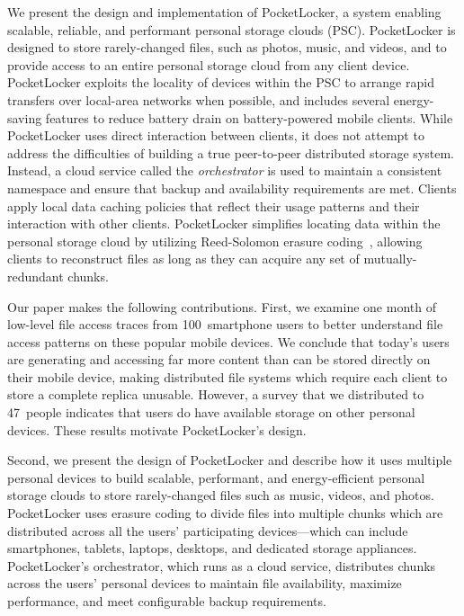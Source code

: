 We present the design and implementation of PocketLocker, a system enabling
scalable, reliable, and performant personal storage clouds (PSC). PocketLocker is
designed to store rarely-changed files, such as photos, music, and videos,
and to provide access to an entire personal storage cloud from any client
device. PocketLocker exploits the locality of devices within the PSC
to arrange rapid transfers over local-area networks when
possible, and includes several energy-saving features to reduce battery
drain on battery-powered mobile clients. While PocketLocker uses direct
interaction between clients, it does not attempt to address the difficulties
of building a true peer-to-peer distributed storage system. Instead, a cloud
service called the \textit{orchestrator} is used to maintain a consistent
namespace and ensure that backup and availability requirements are met.
Clients apply local data caching policies that reflect their usage patterns
and their interaction with other clients. PocketLocker simplifies
locating data within the personal storage cloud by utilizing Reed-Solomon
erasure coding~\cite{reed1960polynomial}, allowing clients to reconstruct files as
long as they can acquire any set of mutually-redundant chunks.

Our paper makes the following contributions. First, we examine one month of
low-level file access traces from 100~smartphone users to better understand
file access patterns on these popular mobile devices. We conclude that
today's users are generating and accessing far more content than can be
stored directly on their mobile device, making distributed file systems which
require each client to store a complete replica unusable. However, a survey
that we distributed to 47~people indicates that users do have available
storage on other personal devices. These results motivate PocketLocker's
design.

Second, we present the design of PocketLocker and describe how it uses
multiple personal devices to build scalable, performant, and energy-efficient
personal storage clouds to store rarely-changed files such as music, videos,
and photos. PocketLocker uses erasure coding to divide files into multiple
chunks which are distributed across all the users' participating devices---which
can include smartphones, tablets, laptops, desktops, and dedicated storage
appliances. PocketLocker’s orchestrator, which runs as a cloud service,
distributes chunks across the users’ personal devices to maintain file
availability, maximize performance, and meet configurable backup
requirements.

